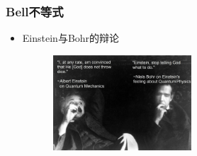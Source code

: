 \begin{frame}
	\frametitle{\textrm{Bell}不等式}
	\begin{itemize}
		\item \textrm{Einstein}与\textrm{Bohr}的辩论
            \begin{figure}
        \centering
                \includegraphics[height=1.4in, width=2.1in, viewport=0 0 2119 1460,clip]{Figures/Einstein-and-Bohr-debate.jpg}
		\label{Fig:Einstein-Bohr}
            \end{figure}

\end{itemize}
\end{frame}
